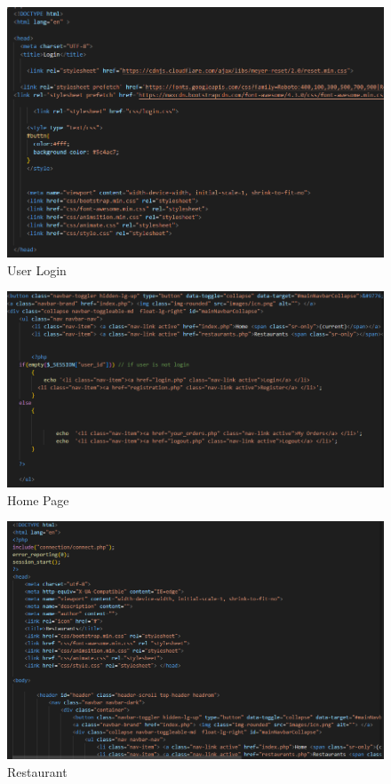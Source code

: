 \begin{figure}[h]
    \centering
    \includegraphics[scale=0.55]{c3.png}
    \caption{User Login }
    \label{fig:pereva}
\end{figure}

\begin{figure}[h]
    \centering
    \includegraphics[scale=0.55]{c4.png}
    \caption{Home Page}
    \label{fig:pereva}
\end{figure}

\begin{figure}[h]
    \centering
    \includegraphics[scale=0.55]{c5.png}
    \caption{Restaurant }
    \label{fig:pereva}
\end{figure}

